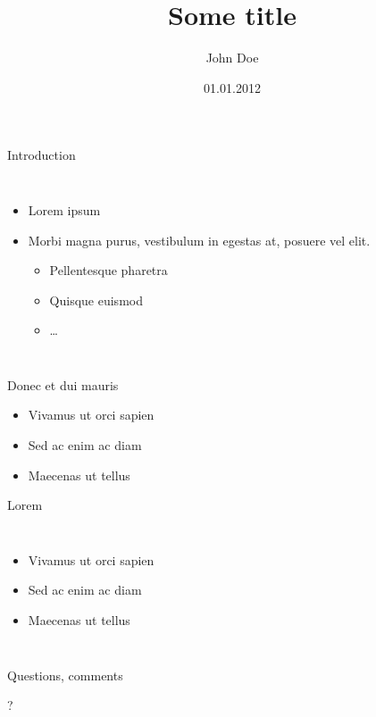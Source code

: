 \documentclass[first=dgreen,second=purple,logo=redquo]{aaltoslides}
\title{Some title}
\author{John Doe}
\date{01.01.2012}
\institute{Aalto University}
\begin{document}
\aaltotitleframe

\begin{frame}{Introduction}
	\begin{columns}[c]
		\begin{itemize}
			\item Lorem ipsum
			\item Morbi magna purus, vestibulum in egestas at, posuere vel elit.
			\begin{itemize}
				\item Pellentesque pharetra
				\item Quisque euismod
				\item \ldots
			\end{itemize}
		\end{itemize}
		\resizebox{\linewidth}{!}{}
	\end{columns}
\end{frame}


\begin{frame}{Donec et dui mauris}
	\begin{itemize}
		\item Vivamus ut orci sapien
		\item Sed ac enim ac diam
		\item Maecenas ut tellus
	\end{itemize}
\end{frame}

\begin{frame}{Lorem}
	\begin{columns}[c]
		\begin{itemize}
			\item Vivamus ut orci sapien
			\item Sed ac enim ac diam
			\item Maecenas ut tellus
		\end{itemize}
		\resizebox{\linewidth}{!}{}
	\end{columns}
\end{frame}

\begin{frame}{Questions, comments}
\begin{center}
	\fontsize{80}{80}\selectfont ?
\end{center}
\end{frame}
\end{document}
